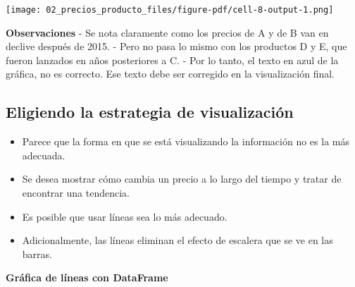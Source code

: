 \documentclass[
  letterpaper,
  DIV=11,
  numbers=noendperiod]{scrreprt}
\providecommand{\tightlist}{%
  \setlength{\itemsep}{0pt}\setlength{\parskip}{0pt}}\usepackage{longtable,booktabs,array}
\begin{document}
\texttt{[image: 02\_precios\_producto\_files/figure-pdf/cell-8-output-1.png]}

\textbf{Observaciones} - Se nota claramente como los precios de A y de B
van en declive después de 2015. - Pero no pasa lo mismo con los
productos D y E, que fueron lanzados en años posteriores a C. - Por lo
tanto, el texto en azul de la gráfica, no es correcto. Ese texto debe
ser corregido en la visualización final.

\subsection{Eligiendo la estrategia de
visualización}\label{eligiendo-la-estrategia-de-visualizaciuxf3n}

\begin{itemize}
\tightlist
\item
  Parece que la forma en que se está visualizando la información no es
  la más adecuada.
\item
  Se desea mostrar cómo cambia un precio a lo largo del tiempo y tratar
  de encontrar una tendencia.
\item
  Es posible que usar líneas sea lo más adecuado.
\item
  Adicionalmente, las líneas eliminan el efecto de escalera que se ve en
  las barras.
\end{itemize}

\textbf{Gráfica de líneas con DataFrame}
\end{document}
